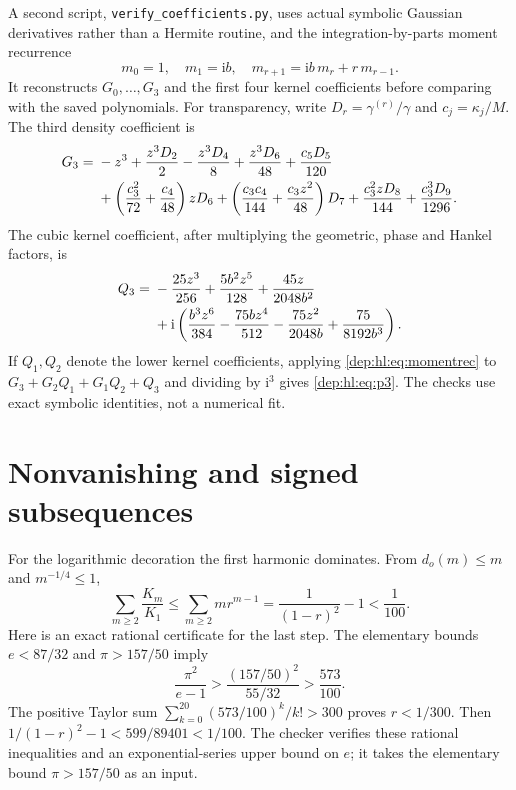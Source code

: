 \documentclass[11pt]{article}
\theoremstyle{definition}\newtheorem{definition}[theorem]{Definition}
\theoremstyle{remark}\newtheorem{remark}[theorem]{Remark}
\newcommand{\ii}{\mathrm i}
\begin{document}
A second script, \texttt{verify\_coefficients.py}, uses actual
symbolic Gaussian derivatives rather than a Hermite routine, and the
integration-by-parts moment recurrence
\begin{equation}\label{dep:hl:eq:momentrec}
 m_0=1,\quad m_1=\ii b,\quad
 m_{r+1}=\ii b\,m_r+r\,m_{r-1}.
\end{equation}
It reconstructs $G_0,\ldots,G_3$ and the first four kernel coefficients
before comparing with the saved polynomials. For transparency, write
$D_r=\gamma^{(r)}/\gamma$ and $c_j=\kappa_j/M$. The third density
coefficient is
\begin{align}\label{dep:hl:eq:G3}
 G_3={}&-z^3+\frac{z^3D_2}{2}-\frac{z^3D_4}{8}
       +\frac{z^3D_6}{48}+\frac{c_5D_5}{120}\notag\\
 &+\left(\frac{c_3^2}{72}+\frac{c_4}{48}\right)zD_6
 +\left(\frac{c_3c_4}{144}+\frac{c_3z^2}{48}\right)D_7
 +\frac{c_3^2zD_8}{144}+\frac{c_3^3D_9}{1296}.
\end{align}
The cubic kernel coefficient, after multiplying the geometric,
phase and Hankel factors, is
\begin{align}\label{dep:hl:eq:kernel3}
 Q_3={}&-\frac{25z^3}{256}+\frac{5b^2z^5}{128}
          +\frac{45z}{2048b^2}\notag\\
 &+\ii\left(\frac{b^3z^6}{384}-\frac{75bz^4}{512}
             -\frac{75z^2}{2048b}+\frac{75}{8192b^3}\right).
\end{align}
If $Q_1,Q_2$ denote the lower kernel coefficients, applying
\eqref{dep:hl:eq:momentrec} to $G_3+G_2Q_1+G_1Q_2+Q_3$ and dividing by
$\ii^3$ gives \eqref{dep:hl:eq:p3}. The checks use exact symbolic identities,
not a numerical fit.

\section{Nonvanishing and signed subsequences}\label{dep:hl:sec:sign}
For the logarithmic decoration the first harmonic dominates. From
$d_o(m)\le m$ and $m^{-1/4}\le1$,
\begin{equation}\label{dep:hl:eq:tail}
 \sum_{m\ge2}\frac{K_m}{K_1}
 \le\sum_{m\ge2}mr^{m-1}
 =\frac1{(1-r)^2}-1<\frac1{100}.
\end{equation}
Here is an exact rational certificate for the last step. The elementary
bounds $e<87/32$ and $\pi>157/50$ imply
\[
 \frac{\pi^2}{e-1}>\frac{(157/50)^2}{55/32}>\frac{573}{100}.
\]
The positive Taylor sum
$\sum_{k=0}^{20}(573/100)^k/k!>300$ proves $r<1/300$.
Then $1/(1-r)^2-1<599/89401<1/100$. The checker verifies these
rational inequalities and an exponential-series upper bound on $e$;
it takes the elementary bound $\pi>157/50$ as an input.
\end{document}
